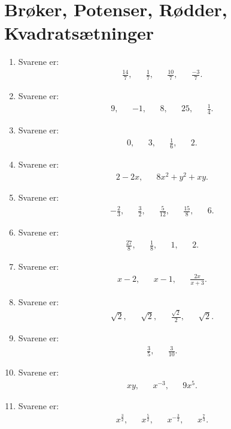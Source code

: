 \section{Brøker, Potenser, Rødder, Kvadratsætninger}

\begin{enumerate}
\item Svarene er:
\begin{align*}
\frac{14}{7},&& \frac{1}{7},&& \frac{10}{7},&& \frac{-3}{7}.
\end{align*}

\item Svarene er:
\begin{align*}
9,&& -1,&& 8,&& 25,&& \frac{1}{4}.
\end{align*}

\item Svarene er:
\begin{align*}
0,&& 3,&& \frac{1}{6},&& 2.
\end{align*}
\item Svarene er:
\begin{align*}
2-2x,&& 8x^2+y^2+xy.
\end{align*}

\item Svarene er:
\begin{align*}
-\frac{2}{3},&&\frac{3}{2},&& \frac{5}{12},&& \frac{15}{8},&& 6.
\end{align*}

\item Svarene er:
\begin{align*}
\frac{27}{8},&& \frac{1}{8},&& 1,&& 2.
\end{align*}

\item Svarene er:
\begin{align*}
x-2,&& x-1,&&\frac{2x}{x+3}.
\end{align*}

\item Svarene er:
\begin{align*}
\sqrt{2},&& \sqrt{2},&& \frac{\sqrt{2}}{2},&& \sqrt{2}.
\end{align*}

\item Svarene er:
\begin{align*}
\frac{3}{5},&&\frac{3}{10}.
\end{align*}

\item Svarene er:
\begin{align*}
xy,&& x^{-3},&& 9x^5.
\end{align*}




\item Svarene er:
\begin{align*}
x^{\frac{3}{2}},&& x^{\frac{5}{2}},&& x^{-\frac{3}{2}},&& x^{\frac{7}{3}}.
\end{align*}



















\end{enumerate}

